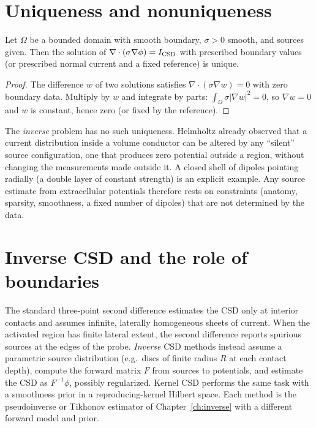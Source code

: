 \section{Uniqueness and nonuniqueness}
\begin{theorem}
Let $\Omega$ be a bounded domain with smooth boundary, $\sigma>0$ smooth, and sources given. Then the solution of $\nabla\cdot(\sigma\nabla\phi)=I_{\rm CSD}$ with prescribed boundary values (or prescribed normal current and a fixed reference) is unique.
\end{theorem}
\begin{proof}
The difference $w$ of two solutions satisfies $\nabla\cdot(\sigma\nabla w)=0$ with zero boundary data. Multiply by $w$ and integrate by parts: $\int_\Omega\sigma|\nabla w|^2=0$, so $\nabla w=0$ and $w$ is constant, hence zero (or fixed by the reference).
\end{proof}
The \emph{inverse} problem has no such uniqueness. Helmholtz already observed that a current distribution inside a volume conductor can be altered by any ``silent'' source configuration, one that produces zero potential outside a region, without changing the measurements made outside it. A closed shell of dipoles pointing radially (a double layer of constant strength) is an explicit example. Any source estimate from extracellular potentials therefore rests on constraints (anatomy, sparsity, smoothness, a fixed number of dipoles) that are not determined by the data.

\section{Inverse CSD and the role of boundaries}
The standard three-point second difference estimates the CSD only at interior contacts and assumes infinite, laterally homogeneous sheets of current. When the activated region has finite lateral extent, the second difference reports spurious sources at the edges of the probe. \emph{Inverse} CSD methods instead assume a parametric source distribution (e.g.\ discs of finite radius $R$ at each contact depth), compute the forward matrix $F$ from sources to potentials, and estimate the CSD as $F^{-1}\phi$, possibly regularized. Kernel CSD performs the same task with a smoothness prior in a reproducing-kernel Hilbert space. Each method is the pseudoinverse or Tikhonov estimator of Chapter~\ref{ch:inverse} with a different forward model and prior.

